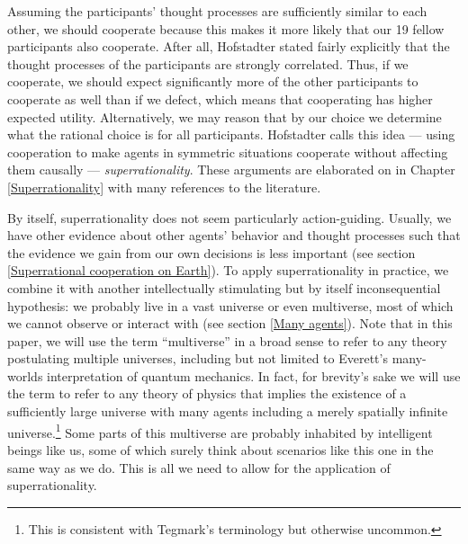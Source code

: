 \documentclass{book}
\begin{document}
Assuming the participants’ thought processes are sufficiently similar to each other, we should cooperate because this makes it more likely that our 19 fellow participants also cooperate. After all, Hofstadter stated fairly explicitly that the thought processes of the participants are strongly correlated. Thus, if we cooperate, we should expect significantly more of the other participants to cooperate as well than if we defect, which means that cooperating has higher expected utility. Alternatively, we may reason that by our choice we determine what the rational choice is for all participants. Hofstadter calls this idea --- using cooperation to make agents in symmetric situations cooperate without affecting them causally --- \textit{superrationality}. These arguments are elaborated on in Chapter \ref{Superrationality} with many references to the literature.
 
By itself, superrationality does not seem particularly action-guiding. Usually, we have other evidence about other agents’ behavior and thought processes such that the evidence we gain from our own decisions is less important (see section \ref{Superrational cooperation on Earth}). To apply superrationality in practice, we combine it with another intellectually stimulating but by itself inconsequential hypothesis: we probably live in a vast universe or even multiverse, most of which we cannot observe or interact with (see section \ref{Many agents}). Note that in this paper, we will use the term “multiverse” in a broad sense to refer to any theory postulating multiple universes, including but not limited to Everett’s many-worlds interpretation of quantum mechanics. In fact, for brevity’s sake we will use the term to refer to any theory of physics that implies the existence of a sufficiently large universe with many agents including a merely spatially infinite universe.\footnote{This is consistent with Tegmark's \parencite*{Tegmark2003-sl} terminology but otherwise uncommon.} Some parts of this multiverse are probably inhabited by intelligent beings like us, some of which surely think about scenarios like this one in the same way as we do. This is all we need to allow for the application of superrationality. 
\end{document}
